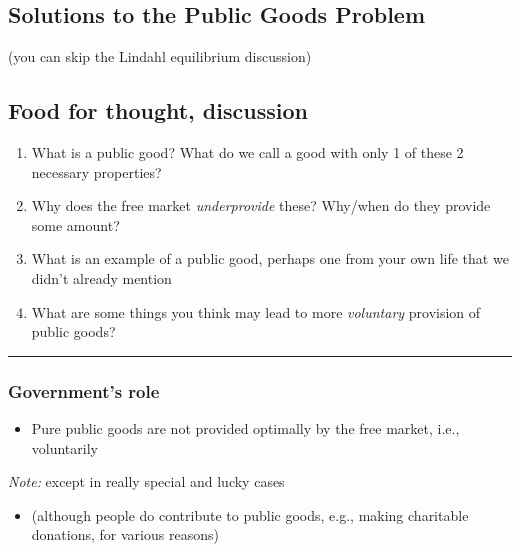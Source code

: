 \documentclass[]{article}
\providecommand{\tightlist}{%
  \setlength{\itemsep}{0pt}\setlength{\parskip}{0pt}}
\begin{document}
\hypertarget{solutions-to-the-public-goods-problem}{%
\subsection{Solutions to the Public Goods
Problem}\label{solutions-to-the-public-goods-problem}}

(you can skip the Lindahl equilibrium discussion)

\hypertarget{food-for-thought-discussion}{%
\subsection{Food for thought,
discussion}\label{food-for-thought-discussion}}

\begin{enumerate}
\def\labelenumi{\arabic{enumi}.}
\item
  What is a public good? What do we call a good with only 1 of these 2
  necessary properties?
\item
  Why does the free market \emph{underprovide} these? Why/when do they
  provide some amount?
\item
  What is an example of a public good, perhaps one from your own life
  that we didn't already mention
\item
  What are some things you think may lead to more \emph{voluntary}
  provision of public goods?
\end{enumerate}

\begin{center}\rule{0.5\linewidth}{\linethickness}\end{center}

\hypertarget{governments-role}{%
\subsubsection{Government's role}\label{governments-role}}

\begin{itemize}
\tightlist
\item
  Pure public goods are not provided optimally by the free market, i.e.,
  voluntarily
\end{itemize}

\emph{Note:} except in really special and lucky cases

\begin{itemize}
\tightlist
\item
  (although people do contribute to public goods, e.g., making
  charitable donations, for various reasons)
\end{itemize}
\end{document}
